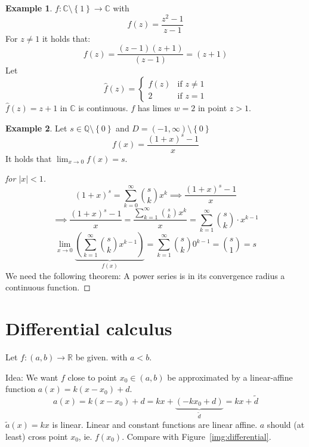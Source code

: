 \documentclass[a4paper,landscape,twocolumn]{article}
\theoremstyle{definition}
\newtheorem{ex}{Example}
\newcommand\set[1]{\left\{#1\right\}}
\newcommand\abs[1]{\left|#1\right|}
\begin{document}
\begin{ex}
  $f: \mathbb C \setminus \set{1} \to \mathbb C$ with
  \[ f(z) = \frac{z^2 - 1}{z - 1} \]
  For $z \neq 1$ it holds that:
  \[ f(z) = \frac{(z - 1)(z + 1)}{(z - 1)} = (z + 1) \]
  Let
  \[
    \hat{f}(z) = \begin{cases}
      f(z) & \text{if } z \neq 1 \\
      2 & \text{if } z = 1
    \end{cases}
  \]
  $\hat{f}(z) = z + 1$ in $\mathbb C$ is continuous.
  $f$ has limes $w = 2$ in point $z > 1$.
\end{ex}
\begin{ex}
  Let $s \in \mathbb Q \setminus \set{0}$ and $D = (-1, \infty) \setminus \set{0}$
  \[ f(x) = \frac{(1 + x)^s - 1}{x} \]
  It holds that $\lim_{x \to 0} f(x) = s$.
  \begin{proof}[for $\abs{x} < 1$]
    \[ (1 + x)^s = \sum_{k = 0}^\infty \binom sk x^k \implies \frac{(1 + x)^s - 1}{x} \]
    \[
      \implies \frac{(1 + x)^s - 1}{x}
      = \frac{\sum_{k=1}^\infty \binom sk x^k}{x}
      = \sum_{k=1}^\infty \binom sk \cdot x^{k-1}
    \] \[
      \lim_{x \to 0} \underbrace{\left(
        \sum_{k=1}^\infty \binom sk x^{k-1}
      \right)}_{f(x)}
      = \sum_{k=1}^\infty \binom sk 0^{k-1}
      = \binom s1 = s
    \]
    We need the following theorem: A power series is in its convergence
    radius a continuous function.
  \end{proof}
\end{ex}

\section{Differential calculus}
%
Let $f: (a, b) \to \mathbb R$ be given. with $a < b$.

Idea: We want $f$ close to point $x_0 \in (a, b)$
be approximated by a linear-affine function $a(x) = k(x - x_0) + d$.
%
\[ a(x) = k (x - x_0) + d = kx + \underbrace{(-kx_0 + d)}_{\tilde d} = kx + \tilde d \]
$\tilde a(x) = kx$ is linear. Linear and constant functions are linear affine.
$a$ should (at least) cross point $x_0$, ie. $f(x_0)$. Compare with Figure~\ref{img:differential}.
\end{document}
